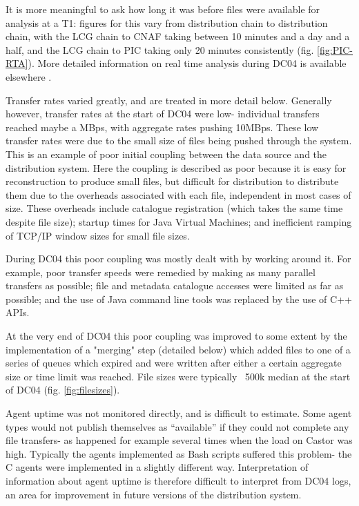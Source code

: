 \documentclass{cmspaper}
\begin{document}
It is more meaningful to ask how long it was before files were
available for analysis at a T1: figures for this vary from
distribution chain to distribution chain, with the LCG chain to CNAF
taking between 10 minutes and a day and a half, and the LCG chain to
PIC taking only 20 minutes consistently (fig. \ref{fig:PIC-RTA}). More
detailed information on real time analysis during DC04 is available
elsewhere \cite{rtadoc}.

Transfer rates varied greatly, and are treated in more detail
below. Generally however, transfer rates at the start of DC04 were
low- individual transfers reached maybe a MBps, with aggregate rates
pushing 10MBps. These low transfer rates were due to the small size of
files being pushed through the system. This is an example of poor
initial coupling between the data source and the distribution
system. Here the coupling is described as poor because it is easy for
reconstruction to produce small files, but difficult for distribution
to distribute them due to the overheads associated with each file,
independent in most cases of size. These overheads include catalogue
registration (which takes the same time despite file size); startup
times for Java Virtual Machines; and inefficient ramping of TCP/IP
window sizes for small file sizes.

During DC04 this poor coupling was mostly dealt with by working around
it. For example, poor transfer speeds were remedied by making as many
parallel transfers as possible; file and metadata catalogue accesses
were limited as far as possible; and the use of Java command line
tools was replaced by the use of C++ APIs.

At the very end of DC04 this poor coupling was improved to some extent
by the implementation of a "merging" step (detailed below) which added
files to one of a series of queues which expired and were written
after either a certain aggregate size or time limit was reached. File
sizes were typically ~500k median at the start of DC04
(fig. \ref{fig:filesizes}).

Agent uptime was not monitored directly, and is difficult to
estimate. Some agent types would not publish themselves as
``available'' if they could not complete any file transfers- as
happened for example several times when the load on Castor was
high. Typically the agents implemented as Bash scripts suffered this
problem- the C agents were implemented in a slightly different way.
Interpretation of information about agent uptime is therefore
difficult to interpret from DC04 logs, an area for improvement in
future versions of the distribution system.
\end{document}
